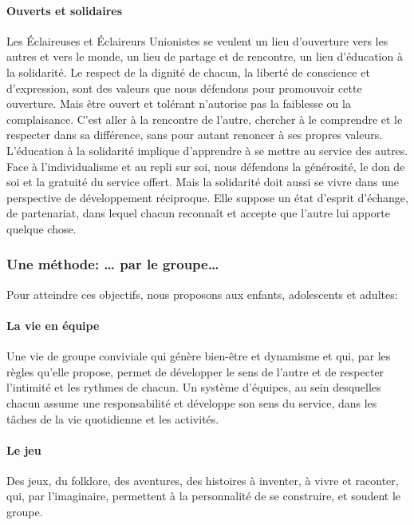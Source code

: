 \documentclass[titlepage,11pt,a4paper]{article}
\begin{document}
\paragraph*{Ouverts et solidaires}

Les Éclaireuses et Éclaireurs Unionistes se veulent un lieu d'ouverture vers les autres et vers le monde, un lieu de partage et de rencontre, un lieu d'éducation à la solidarité.
Le respect de la dignité de chacun, la liberté de conscience et d'expression, sont des valeurs que nous défendons pour promouvoir cette ouverture. Mais être ouvert et tolérant n'autorise pas la faiblesse ou la complaisance. C'est aller à la rencontre de l'autre, chercher à le comprendre et le respecter dans sa différence, sans pour autant renoncer à ses propres valeurs.
L'éducation à la solidarité implique d'apprendre à se mettre au service des autres. Face à l'individualisme et au repli sur soi, nous défendons la générosité, le don de soi et la gratuité du service offert. Mais la solidarité doit aussi se vivre dans une perspective de développement réciproque.
Elle suppose un état d'esprit d'échange, de partenariat, dans lequel chacun reconnaît et accepte que l'autre lui apporte quelque chose.

\subsubsection*{Une méthode: … par le groupe…}

Pour atteindre ces objectifs, nous proposons aux enfants, adolescents et adultes:

\paragraph*{La vie en équipe}

Une vie de groupe conviviale qui génère bien-être et dynamisme et qui, par les règles qu'elle propose, permet de développer le sens de l'autre et de respecter l'intimité et les rythmes de chacun.
Un système d'équipes, au sein desquelles chacun assume une responsabilité et développe son sens du service, dans les tâches de la vie quotidienne et les activités.

\paragraph*{Le jeu}

Des jeux, du folklore, des aventures, des histoires à inventer, à vivre et raconter, qui, par l'imaginaire, permettent à la personnalité de se construire, et soudent le groupe.
\end{document}
